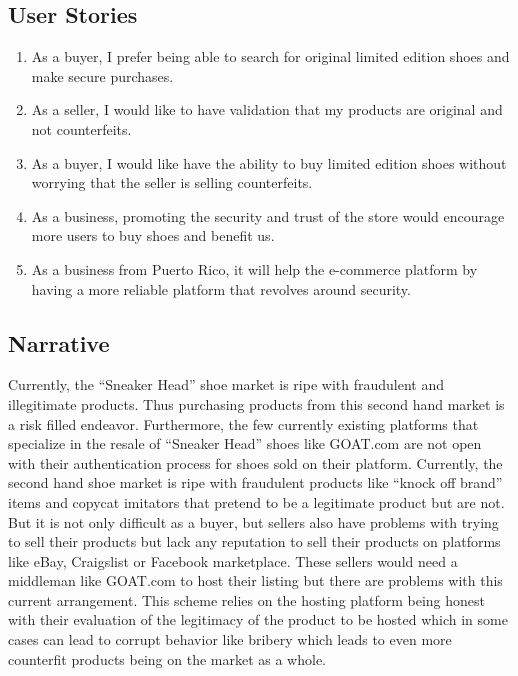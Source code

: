 \subsection{User Stories}
\begin{enumerate}
  \item As a buyer, I prefer being able to search for original limited edition shoes and make secure purchases.
  \item As a seller, I would like to have validation that my products are original and not counterfeits.
  \item As a buyer, I would like have the ability to buy limited edition shoes without worrying that the seller is selling counterfeits.
  \item As a business, promoting the security and trust of the store would encourage more users to buy shoes and benefit us.
  \item As a business from Puerto Rico, it will help the e-commerce platform by having a more reliable platform that revolves around security.
\end{enumerate}
\subsection{Narrative}
\hspace{1cm} Currently, the ``Sneaker Head'' shoe market is ripe with fraudulent and illegitimate products. Thus purchasing products from this second hand market is a risk filled endeavor. Furthermore, the few currently existing platforms that specialize in the resale of ``Sneaker Head'' shoes like GOAT.com are not open with their authentication process for shoes sold on their platform. Currently, the second hand shoe market is ripe with fraudulent products like ``knock off brand'' items and copycat imitators that pretend to be a legitimate product but are not. But it is not only difficult as a buyer, but sellers also have problems with trying to sell their products but lack any reputation to sell their products on platforms like eBay, Craigslist or Facebook marketplace. These sellers would need a middleman like GOAT.com to host their listing but there are problems with this current arrangement. This scheme relies on the hosting platform being honest with their evaluation of the legitimacy of the product to be hosted which in some cases can lead to corrupt behavior like bribery which leads to even more counterfit products being on the market as a whole.

